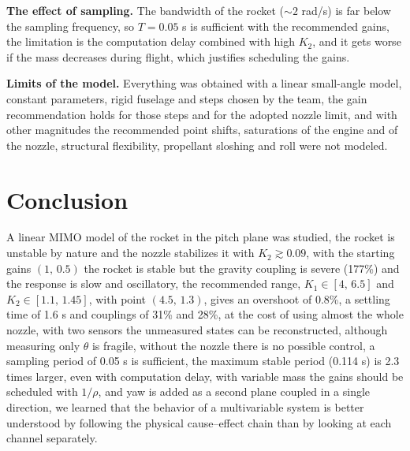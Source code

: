 \documentclass[article, 11pt]{IEEEtran}   %
\begin{document}
\textbf{The effect of sampling.} The bandwidth of the rocket ($\sim2$ rad/s) is far below the sampling frequency, so $T=0.05$ s is sufficient with the recommended gains, the limitation is the computation delay combined with high $K_2$, and it gets worse if the mass decreases during flight, which justifies scheduling the gains.

\textbf{Limits of the model.} Everything was obtained with a linear small-angle model, constant parameters, rigid fuselage and steps chosen by the team, the gain recommendation holds for those steps and for the adopted nozzle limit, and with other magnitudes the recommended point shifts, saturations of the engine and of the nozzle, structural flexibility, propellant sloshing and roll were not modeled.

\section{Conclusion}
A linear MIMO model of the rocket in the pitch plane was studied, the rocket is unstable by nature and the nozzle stabilizes it with $K_2\gtrsim0.09$, with the starting gains $(1,\,0.5)$ the rocket is stable but the gravity coupling is severe (177\%) and the response is slow and oscillatory, the recommended range, $K_1\in[4,\,6.5]$ and $K_2\in[1.1,\,1.45]$, with point $(4.5,\,1.3)$, gives an overshoot of 0.8\%, a settling time of 1.6 s and couplings of 31\% and 28\%, at the cost of using almost the whole nozzle, with two sensors the unmeasured states can be reconstructed, although measuring only $\theta$ is fragile, without the nozzle there is no possible control, a sampling period of 0.05 s is sufficient, the maximum stable period (0.114 s) is 2.3 times larger, even with computation delay, with variable mass the gains should be scheduled with $1/\rho$, and yaw is added as a second plane coupled in a single direction, we learned that the behavior of a multivariable system is better understood by following the physical cause--effect chain than by looking at each channel separately.
\end{document}
